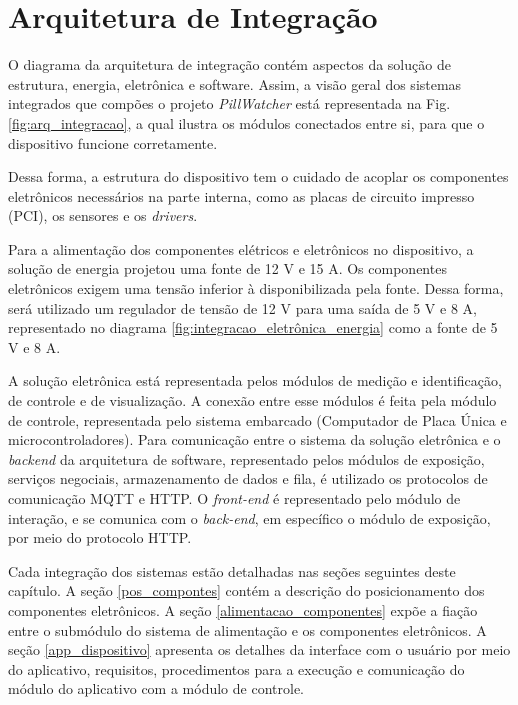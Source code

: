 \chapter[Arquitetura de Integração]{Arquitetura de Integração}

O diagrama da arquitetura de integração contém aspectos da solução de estrutura, energia, eletrônica e software. Assim, a visão geral dos sistemas integrados que compões o projeto \textit{PillWatcher} está representada na Fig. \ref{fig:arq_integracao}, a qual ilustra os módulos conectados entre si, para que o dispositivo funcione corretamente. 

Dessa forma, a estrutura do dispositivo tem o cuidado de acoplar os componentes eletrônicos necessários na parte interna, como as placas de circuito impresso (PCI), os sensores e os \textit{drivers}. 

Para a alimentação dos componentes elétricos e eletrônicos no dispositivo, a solução de energia projetou uma fonte de 12 V e 15 A. Os componentes eletrônicos exigem uma tensão inferior à disponibilizada pela fonte. Dessa forma, será utilizado um regulador de tensão de 12 V para uma saída de 5 V e 8 A, representado no diagrama \ref{fig:integracao_eletrônica_energia} como a fonte de 5 V e 8 A.

A solução eletrônica está representada pelos módulos de medição e identificação, de controle e de visualização. A conexão entre esse módulos é feita pela módulo de controle, representada pelo sistema embarcado (Computador de Placa Única e microcontroladores). Para comunicação entre o sistema da solução eletrônica e o \textit{backend} da arquitetura de software, representado pelos módulos de exposição, serviços negociais, armazenamento de dados e fila, é utilizado os protocolos de comunicação MQTT e HTTP. O \textit{front-end} é representado pelo módulo de interação, e se comunica com o \textit{back-end}, em específico o módulo de exposição, por meio do protocolo HTTP.

Cada integração dos sistemas estão detalhadas nas seções seguintes deste capítulo. A seção \ref{pos_compontes} contém a descrição do posicionamento dos componentes eletrônicos. A seção \ref{alimentacao_componentes} expõe a fiação entre o submódulo do sistema de alimentação e os componentes eletrônicos. A seção \ref{app_dispositivo} apresenta os detalhes da interface com o usuário por meio do aplicativo, requisitos, procedimentos para a execução e comunicação do módulo do aplicativo com a módulo de controle.

